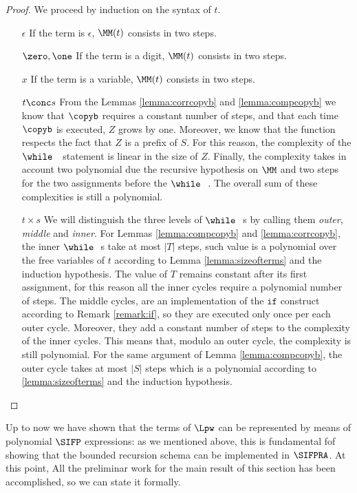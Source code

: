 \begin{proof}
We proceed by induction on the syntax of $t$.
\begin{itemize}
\item[$\epsilon$] If the term is $\epsilon$, $\MM(t)$ consists in two steps.
\item[$\zero,\one$] If the term is a digit,  $\MM(t)$ consists in two steps.
\item[$x$] If the term is a variable, $\MM(t)$ consists in two steps.
\item[$t \conc s$] From the Lemmas \ref{lemma:corrcopyb} and \ref{lemma:compcopyb} we know that $\copyb$ requires a constant number of steps, and that each time $\copyb$ is executed, $Z$ grows by one. Moreover, we know that the function respects the fact that $Z$ is a prefix of $S$. For this reason, the complexity of the $\while\ \ $ statement is linear in the size of $Z$. Finally, the complexity takes in account two polynomial due the recursive hypothesis on $\MM$ and two steps for the two assignments before the $\while\ \ $. The overall sum of these complexities is still a polynomial.
\item[$t \times s$] We will distinguish the three levels of $\while\ \ $s by calling them \emph{outer}, \emph{middle} and \emph{inner}. For Lemmas \ref{lemma:compcopyb} and \ref{lemma:corrcopyb}, the inner $\while\ \ $s take at most $|T|$ steps, such value is a polynomial over the free variables of $t$ according to Lemma \ref{lemma:sizeofterms} and the induction hypothesis. The value of $T$ remains constant after its first assignment, for this reason all the inner cycles require a polynomial number of steps. The middle cycles, are an implementation of the $\mathtt{if}$ construct according to Remark \ref{remark:if}, so they are executed only once per each outer cycle. Moreover, they add a constant number of steps to the complexity of the inner cycles. This means that, modulo an outer cycle, the complexity is still polynomial. For the same argument of Lemma \ref{lemma:compcopyb}, the outer cycle takes at most $|S|$ steps which is a polynomial according to \ref{lemma:sizeofterms} and the induction hypothesis.
\end{itemize}
\end{proof}

Up to now we have shown that the terms of $\Lpw$ can be represented
by means of polynomial $\SIFP$ expressions: as we mentioned above, this is
fundamental fof showing that the bounded recursion schema can be implemented in
$\SIFPRA$. At this point, All the preliminar work for the main result of this section
has been accomplished, so we can state it formally.


